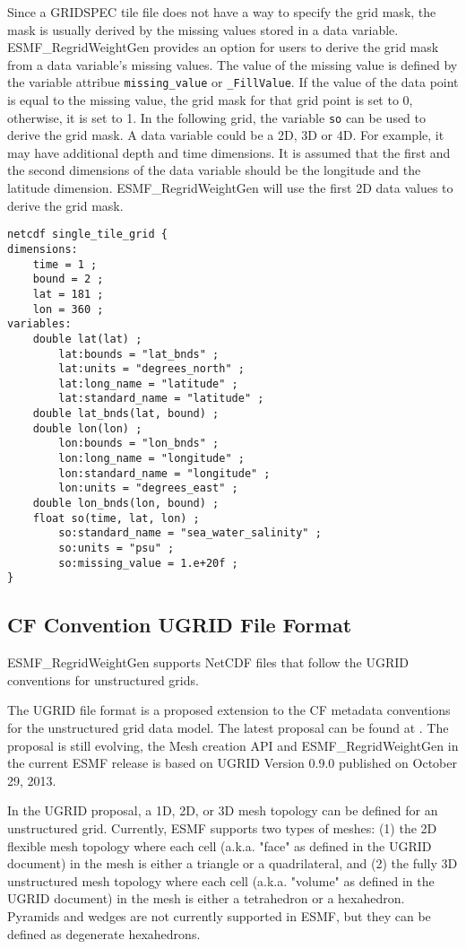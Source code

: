 Since a GRIDSPEC tile file does not have a way to specify the grid mask, the mask is usually derived by the missing values stored in a data variable.  ESMF\_RegridWeightGen provides an option for users to
derive the grid mask from a data variable's missing values.  The value of the missing value is defined by the
variable attribue {\tt missing\_value} or {\tt \_FillValue}.  If the value of the data point is equal to the
missing value, the grid mask for that grid point is set to 0, otherwise, it is set to 1.   In the following
grid, the variable {\tt so} can be used to derive the grid mask.  A data variable could be a 2D, 3D or 4D.
For example, it may have additional depth and time dimensions.
It is assumed that the first and the second dimensions of the data variable should be the longitude and the
latitude dimension.  ESMF\_RegridWeightGen will use the first 2D data values to derive the grid mask.

\begin{verbatim}
netcdf single_tile_grid {
dimensions:
	time = 1 ;
	bound = 2 ;
	lat = 181 ;
	lon = 360 ;
variables:
	double lat(lat) ;
		lat:bounds = "lat_bnds" ;
		lat:units = "degrees_north" ;
		lat:long_name = "latitude" ;
		lat:standard_name = "latitude" ;
	double lat_bnds(lat, bound) ;
	double lon(lon) ;
		lon:bounds = "lon_bnds" ;
		lon:long_name = "longitude" ;
		lon:standard_name = "longitude" ;
		lon:units = "degrees_east" ;
	double lon_bnds(lon, bound) ;
	float so(time, lat, lon) ;
		so:standard_name = "sea_water_salinity" ;
		so:units = "psu" ;
		so:missing_value = 1.e+20f ;
}
\end{verbatim}

\subsection{CF Convention UGRID File Format}\label{sec:fileformat:ugrid}

ESMF\_RegridWeightGen supports NetCDF files that follow the UGRID conventions for unstructured grids.

The UGRID file format is a proposed extension to the CF metadata conventions for the unstructured grid data model. The latest proposal can be found at .  The proposal is still evolving, the Mesh creation API and ESMF\_RegridWeightGen in the current ESMF release is based on UGRID Version 0.9.0 published on October 29, 2013.

In the UGRID proposal, a 1D, 2D, or 3D mesh topology can be defined for an unstructured grid.  Currently, ESMF
supports two types of meshes: (1) the 2D flexible mesh topology where each cell (a.k.a. "face" as defined in the UGRID document) in the mesh is either a triangle or a quadrilateral, and (2) the fully 3D unstructured mesh topology where each cell (a.k.a. "volume" as defined in the UGRID document) in the mesh
is either a tetrahedron or a hexahedron.  Pyramids and wedges are not currently supported in ESMF, but they
can be defined as degenerate hexahedrons.   


